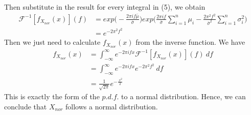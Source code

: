 \documentclass[11pt]{article}
\begin{document}
Then substitute in the result for every integral in (5), we obtain
\begin{equation}
\begin{aligned}
    \mathscr{F}^{-1}[f_{X_{nor}}(x)](f) &=
    exp \bigg(-\frac{2 \pi i f \bar \mu}{\bar \sigma} \bigg)
    exp \bigg(\frac{2 \pi i f}{\bar \sigma} \sum^n_{i=1} \mu_i - \frac{2 \pi^2 f^2}{\bar \sigma^2} \sum_{i=1}^n \sigma_i^2 \bigg) \\
    &= e^{-2\pi^2f^2}
\end{aligned}
\end{equation}
Then we just need to calculate $f_{X_{nor}}(x)$ from the inverse function.
\clearpage
We have
\begin{equation}
\begin{aligned}
    f_{X_{nor}}(x) &= \int_{-\infty}^{\infty} e^{-2\pi i f x} \mathscr{F}^{-1}[f_{X_{nor}}(x)](f) ~df \\
    &= \int_{-\infty}^{\infty} e^{-2\pi i f x} e^{-2\pi^2f^2} ~df \\
    &= \frac{1}{\sqrt{2\pi}}e^{-\frac{~x^2}{2}}
\end{aligned}
\end{equation}
This is exactly the form of the $p.d.f.$ to a normal distribution. Hence, we can conclude that $X_{nor}$ follows a normal distribution.
\end{document}

